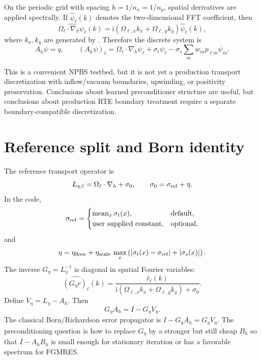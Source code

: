 \documentclass[11pt]{article}
\newcommand{\code}[1]{\texttt{\detokenize{#1}}}
\newcommand{\ii}{\mathrm{i}}
\newcommand{\om}{\Omega}
\newcommand{\Ah}{A_h}
\newcommand{\Bh}{B_h}
\newcommand{\Geta}{G_\eta}
\begin{document}
On the periodic grid with spacing \(h=1/n_x=1/n_y\), spatial derivatives are
applied spectrally.  If \(\widehat{\psi}_\ell(k)\) denotes the two-dimensional
FFT coefficient, then
\begin{equation}
  \widehat{\om_\ell\cdot\nabla_h\psi_\ell}(k)
  =
  \ii(\om_{\ell,x}k_x+\om_{\ell,y}k_y)\widehat{\psi}_\ell(k),
\end{equation}
where \(k_x,k_y\) are generated by \code{torch.fft.fftfreq}.  Therefore the
discrete system is
\begin{equation}
  \Ah \psi = q,
  \qquad
  (\Ah\psi)_\ell
  =
  \om_\ell\cdot\nabla_h \psi_\ell
  +\sigma_t\psi_\ell
  -\sigma_s\sum_m w_m p_{\ell m}\psi_m .
  \label{eq:discrete-A}
\end{equation}

This is a convenient NPBS testbed, but it is not yet a production transport
discretization with inflow/vacuum boundaries, upwinding, or positivity
preservation.  Conclusions about learned preconditioner structure are useful,
but conclusions about production RTE boundary treatment require a separate
boundary-compatible discretization.

\section{Reference split and Born identity}

The reference transport operator is
\begin{equation}
  L_{\eta,\ell}
  =
  \om_\ell\cdot\nabla_h + \sigma_0,
  \qquad
  \sigma_0=\sigma_{\rm ref}+\eta.
\end{equation}
In the code,
\begin{equation}
  \sigma_{\rm ref}
  =
  \begin{cases}
    \operatorname{mean}_x\sigma_t(x), & \text{default},\\
    \text{user supplied constant}, & \text{optional},
  \end{cases}
\end{equation}
and
\begin{equation}
  \eta
  =
  \eta_{\rm floor}
  +
  \eta_{\rm scale}\,
  \max_x\left(|\sigma_t(x)-\sigma_{\rm ref}|+|\sigma_s(x)|\right).
\end{equation}
The inverse \(\Geta=L_\eta^{-1}\) is diagonal in spatial Fourier variables:
\begin{equation}
  \widehat{(\Geta r)_\ell}(k)
  =
  \frac{\widehat r_\ell(k)}
       {\ii(\om_{\ell,x}k_x+\om_{\ell,y}k_y)+\sigma_0}.
  \label{eq:Geta}
\end{equation}
Define \(V_\eta=L_\eta-\Ah\).  Then
\begin{equation}
  \Geta\Ah
  =
  I-\Geta V_\eta.
\end{equation}
The classical Born/Richardson error propagator is \(I-\Geta\Ah=\Geta V_\eta\).
The preconditioning question is how to replace \(\Geta\) by a stronger but
still cheap \(\Bh\) so that \(I-\Ah\Bh\) is small enough for stationary
iteration or has a favorable spectrum for FGMRES.
\end{document}
